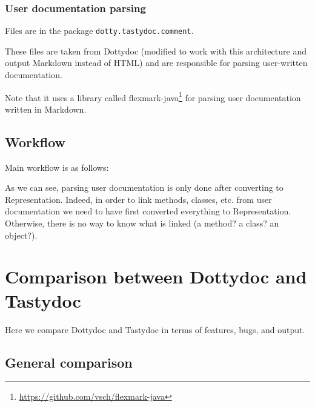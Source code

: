 \documentclass{report}
\begin{document}
\subsection{User documentation parsing}
Files are in the package \texttt{dotty.tastydoc.comment}.

These files are taken from Dottydoc (modified to work with this architecture and output Markdown instead of HTML) and are responsible for parsing user-written documentation.

Note that it uses a library called flexmark-java\footnote{\url{https://github.com/vsch/flexmark-java}} for parsing user documentation written in Markdown.

\section{Workflow}
\label{sec:workflow}
Main workflow is as follows:

\begin{center}
\end{center}

As we can see, parsing user documentation is only done after converting to Representation. Indeed, in order to link methods, classes, etc. from user documentation we need to have first converted everything to Representation. Otherwise, there is no way to know what is linked (a method? a class? an object?).


\chapter{Comparison between Dottydoc and Tastydoc}
Here we compare Dottydoc and Tastydoc in terms of features, bugs, and output.

\section{General comparison}
\label{sec:comparison}
\end{document}
